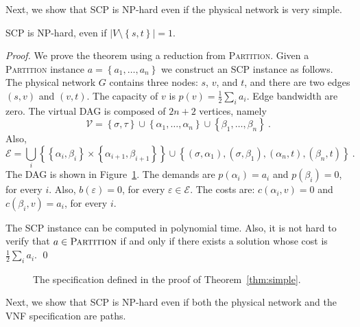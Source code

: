 \documentclass[runningheads]{llncs}
\newcommand{\set}[1]{\left\{ #1 \right\}}
\newcommand{\abs}[1]{\left| #1 \right|}
\newcommand{\half}{\frac{1}{2}}
\newcommand{\eps}{\varepsilon}
\newcommand{\scp}{\textsc{SCP}\xspace}
\newcommand{\calE}{\mathcal{E}}
\newcommand{\calV}{\mathcal{V}}
\begin{document}
Next, we show that \scp is NP-hard even if the physical network is
very simple. 

\begin{theorem}
\label{thm:simple}
\scp is NP-hard, even if $\abs{V \setminus \set{s,t}} = 1$.
\end{theorem}
\begin{proof}
We prove the theorem using a reduction from \textsc{Partition}.
Given a \textsc{Partition} instance $a = \set{a_1, \ldots, a_n}$ we
construct an \scp instance as follows.
%
The physical network $G$ contains three nodes: $s$, $v$, and $t$, and
there are two edges $(s,v)$ and $(v,t)$.  The capacity of $v$ is $p(v)
= \half \sum_i a_i$.  Edge bandwidth are zero.
%
The virtual DAG is composed of $2n+2$ vertices, namely
\[
\calV
= \set{\sigma,\tau}
  \cup \set{\alpha_1, \ldots, \alpha_n}
  \cup \set{\beta_1, \ldots, \beta_n}
~.
\]
Also,
\[
\calE
= \bigcup_i \set{ \set{\alpha_i,\beta_i} \times \set{\alpha_{i+1},\beta_{i+1}} } 
  \cup
  \set{ (\sigma,\alpha_1), (\sigma,\beta_1), (\alpha_n,t), (\beta_n,t) }
~.
\]
The DAG is shown in Figure~\ref{fig:simple}.
%
The demands are $p(\alpha_i) = a_i$ and $p(\beta_i) = 0$, for every
$i$.  Also, $b(\eps) = 0$, for every $\eps \in \calE$.  The costs are:
$c(\alpha_i,v) = 0$ and $c(\beta_i,v) = a_i$, for every $i$.

The \scp instance can be computed in polynomial time.
%
Also, it is not hard to verify that $a \in \textsc{Partition}$ if and
only if there exists a solution whose cost is $\half \sum_i a_i$.
%
\qed
\end{proof}

\begin{figure}[t]
\centering

\caption{The specification defined in the proof of Theorem~\ref{thm:simple}.}
\label{fig:simple}
\end{figure}

Next, we show that \scp is NP-hard even if both the physical network
and the VNF specification are paths.
\end{document}
